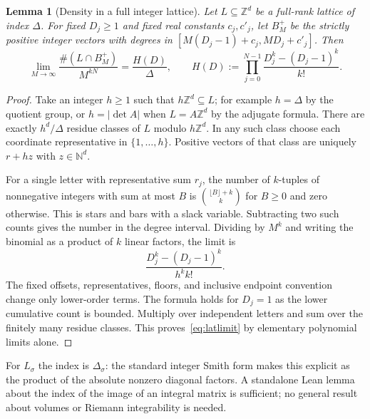 \documentclass[11pt]{article}
\newtheorem{lemma}[theorem]{Lemma}
\theoremstyle{remark}\newtheorem{remark}[theorem]{Remark}
\newcommand{\Z}{\mathbb Z}\newcommand{\N}{\mathbb N}\newcommand{\R}{\mathbb R}
\begin{document}
\begin{lemma}[Density in a full integer lattice]\label{lem:lattice}
Let $L\subseteq\Z^d$ be a full-rank lattice of index $\Delta$. For fixed $D_j\geq1$ and fixed real constants $c_j,c'_j$, let $B_M^+$ be the strictly positive integer vectors with degrees in $[M(D_j-1)+c_j,MD_j+c'_j]$. Then
\begin{equation}\label{eq:latlimit}
 \lim_{M\to\infty}\frac{\#(L\cap B_M^+)}{M^{kN}}
 =\frac{H(D)}{\Delta},\qquad
 H(D):=\prod_{j=0}^{N-1}\frac{D_j^k-(D_j-1)^k}{k!}.
\end{equation}
\end{lemma}
\begin{proof}
Take an integer $h\geq1$ such that $h\Z^d\subseteq L$; for example $h=\Delta$ by the quotient group, or $h=|\det A|$ when $L=A\Z^d$ by the adjugate formula. There are exactly $h^d/\Delta$ residue classes of $L$ modulo $h\Z^d$. In any such class choose each coordinate representative in $\{1,\ldots,h\}$. Positive vectors of that class are uniquely $r+h z$ with $z\in\N^d$.

For a single letter with representative sum $r_j$, the number of $k$-tuples of nonnegative integers with sum at most $B$ is $\binom{\lfloor B\rfloor+k}{k}$ for $B\geq0$ and zero otherwise. This is stars and bars with a slack variable. Subtracting two such counts gives the number in the degree interval. Dividing by $M^k$ and writing the binomial as a product of $k$ linear factors, the limit is
\[
 \frac{D_j^k-(D_j-1)^k}{h^k k!}.
\]
The fixed offsets, representatives, floors, and inclusive endpoint convention change only lower-order terms. The formula holds for $D_j=1$ as the lower cumulative count is bounded. Multiply over independent letters and sum over the finitely many residue classes. This proves~\eqref{eq:latlimit} by elementary polynomial limits alone.
\end{proof}

For $L_\sigma$ the index is $\Delta_\sigma$: the standard integer Smith form makes this explicit as the product of the absolute nonzero diagonal factors. A standalone Lean lemma about the index of the image of an integral matrix is sufficient; no general result about volumes or Riemann integrability is needed.
\end{document}
